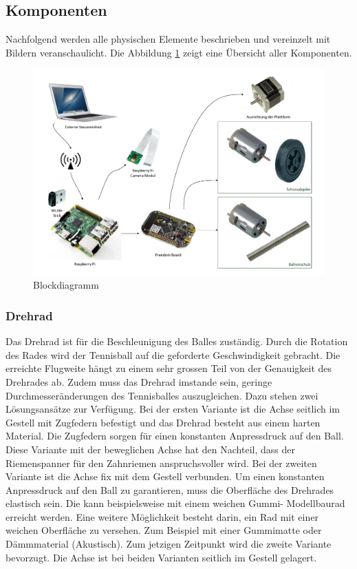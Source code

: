 \subsection{Komponenten}
Nachfolgend werden alle physischen Elemente beschrieben und vereinzelt mit Bildern veranschaulicht. Die Abbildung \ref{fig:blockdiagramm} zeigt eine Übersicht aller Komponenten.

\begin{figure}[h!]
	\centering
	\includegraphics[width=0.9\linewidth]{../../fig/blockdiagramm}
	\caption{Blockdiagramm}
	\label{fig:blockdiagramm}
\end{figure}

\subsubsection{Drehrad}
Das Drehrad ist für die Beschleunigung des Balles zuständig. Durch die Rotation des Rades wird der Tennisball auf die geforderte Geschwindigkeit gebracht. Die erreichte Flugweite hängt zu einem sehr grossen Teil von der Genauigkeit des Drehrades ab. Zudem muss das Drehrad imstande sein, geringe Durchmesseränderungen des Tennisballes auszugleichen. Dazu stehen zwei Lösungsansätze zur Verfügung. Bei der ersten Variante ist die Achse seitlich im Gestell mit Zugfedern befestigt und das Drehrad besteht aus einem harten Material. Die Zugfedern sorgen für einen konstanten Anpressdruck auf den Ball. Diese Variante mit der beweglichen Achse hat den Nachteil, dass der Riemenspanner für den Zahnriemen anspruchsvoller wird. Bei der zweiten Variante ist die Achse fix mit dem Gestell verbunden. Um einen konstanten Anpressdruck auf den Ball zu garantieren, muss die Oberfläche des Drehrades elastisch sein. Die kann beispielsweise mit einem weichen Gummi- Modellbaurad erreicht werden. Eine weitere Möglichkeit besteht darin, ein Rad mit einer weichen Oberfläche zu versehen. Zum Beispiel mit einer Gummimatte oder Dämmmaterial (Akustisch). Zum jetzigen Zeitpunkt wird die zweite Variante bevorzugt. Die Achse ist bei beiden Varianten seitlich im Gestell gelagert.

